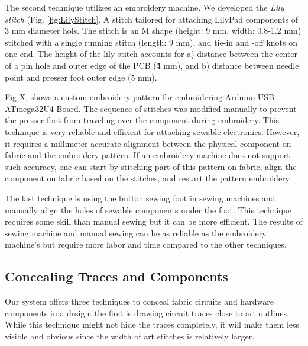 \documentclass[header.tex]{subfiles}
\begin{document}
The second technique utilizes an embroidery machine. We developed the \textit{Lily stitch} (Fig. \ref{fig:LilyStitch}. A stitch tailored for attaching LilyPad components of 3 mm diameter hols. The stitch is an M shape (height: 9 mm, width: 0.8-1.2 mm) stitched with a single running stitch (length: 9 mm), and tie-in and -off knots on one end. 
The height of the lily stitch accounts for a) distance between the center of a pin hole and outer edge of the PCB (\~ 4 mm), and b) distance between needle point and presser foot outer edge (\~5 mm). 

Fig X, shows a custom embroidery pattern for embroidering Arduino USB - ATmega32U4 Board. The sequence of stitches was modified manually to prevent the presser foot from traveling over the component during embroidery. This technique is very reliable and efficient for attaching sewable electronics. However, it requires a millimeter accurate alignment between the physical component on fabric and the embroidery pattern. If an embroidery machine does not support such accuracy, one can start by stitching part of this pattern on fabric, align the component on fabric based on the stitches, and restart the pattern embroidery.

The last technique is using the button sewing foot in sewing machines and manually align the holes of sewable components under the foot. This technique requires some skill than manual sewing but it can be more efficient. 
The results of sewing machine and manual sewing can be as  reliable as the embroidery machine's but require more labor and time compared to the other techniques.  

\subsection{Concealing Traces and Components}
Our system offers three techniques to conceal fabric circuits and hardware components in a design: the first is drawing circuit traces close to art outlines. 
While this technique might not hide the traces completely, it will make them less visible and obvious since the width of art stitches is relatively larger.
\end{document}
